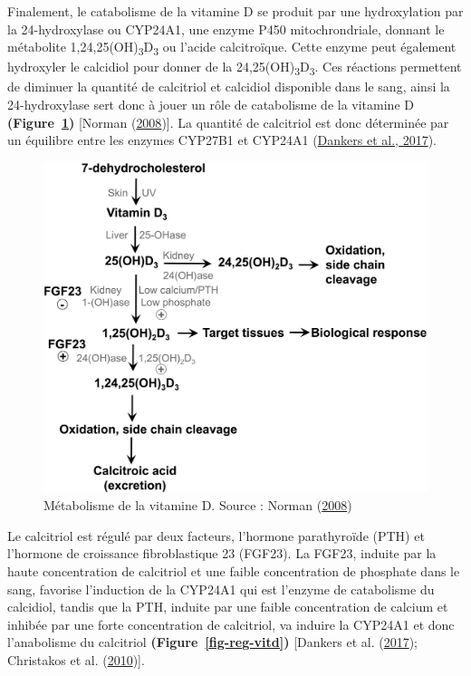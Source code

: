 \documentclass[
  letterpaper,
  DIV=11,
  numbers=noendperiod]{scrartcl}
\begin{document}
Finalement, le catabolisme de la vitamine D se produit par une
hydroxylation par la 24-hydroxylase ou CYP24A1, une enzyme P450
mitochrondriale, donnant le métabolite
1,24,25(OH)\textsubscript{3}D\textsubscript{3} ou l'acide calcitroïque.
Cette enzyme peut également hydroxyler le calcidiol pour donner de la
24,25(OH)\textsubscript{3}D\textsubscript{3}. Ces réactions permettent
de diminuer la quantité de calcitriol et calcidiol disponible dans le
sang, ainsi la 24-hydroxylase sert donc à jouer un rôle de catabolisme
de la vitamine D \textbf{(Figure~\ref{fig-metabolism-vitd})} {[}Norman
(\protect\hyperlink{ref-Norman.2008}{2008}){]}. La quantité de
calcitriol est donc déterminée par un équilibre entre les enzymes
CYP27B1 et CYP24A1 (\protect\hyperlink{ref-Dankers.2017}{Dankers et al.,
2017}).

\begin{figure}

{\centering \includegraphics{figures/vitamin-d-metabolism.png}

}

\caption{\label{fig-metabolism-vitd}Métabolisme de la vitamine D. Source
: Norman (\protect\hyperlink{ref-Norman.2008}{2008})}

\end{figure}

Le calcitriol est régulé par deux facteurs, l'hormone parathyroïde (PTH)
et l'hormone de croissance fibroblastique 23 (FGF23). La FGF23, induite
par la haute concentration de calcitriol et une faible concentration de
phosphate dans le sang, favorise l'induction de la CYP24A1 qui est
l'enzyme de catabolisme du calcidiol, tandis que la PTH, induite par une
faible concentration de calcium et inhibée par une forte concentration
de calcitriol, va induire la CYP24A1 et donc l'anabolisme du calcitriol
\textbf{(Figure~\ref{fig-reg-vitd})} {[}Dankers et al.
(\protect\hyperlink{ref-Dankers.2017}{2017}); Christakos et al.
(\protect\hyperlink{ref-Christakos.2010}{2010}){]}.
\end{document}
